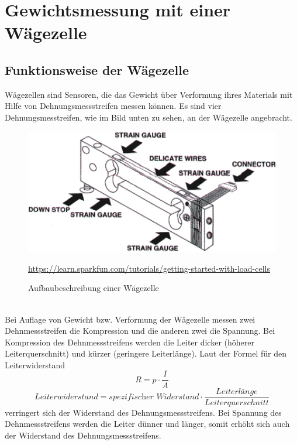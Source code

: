 \chapter{Gewichtsmessung mit einer Wägezelle}
\section{Funktionsweise der Wägezelle}
Wägezellen sind Sensoren, die das Gewicht über Verformung ihres Materials mit Hilfe von Dehnungsmessstreifen messen können. Es sind vier Dehnungsmesstreifen, wie im Bild unten zu sehen, an der Wägezelle angebracht.
\begin{figure}[ht]
    \center
    \includegraphics[width=15cm]{Bilder/waegezelle-aufbaubeschreibung.jpg}\\
    \caption{Aufbaubeschreibung einer Wägezelle}
    \begin{flushleft} \quelle\url{https://learn.sparkfun.com/tutorials/getting-started-with-load-cells} \end{flushleft}
\end{figure}\\
Bei Auflage von Gewicht bzw. Verformung der Wägezelle messen zwei Dehnmessstreifen die Kompression und die anderen zwei die Spannung. Bei Kompression des Dehnmessstreifens werden die Leiter dicker (höherer Leiterquerschnitt) und kürzer (geringere Leiterlänge). Laut der Formel für den Leiterwiderstand \[R=p \cdot \frac{I}{A}\] \[Leiterwiderstand=\textit{spezifischer Widerstand} \cdot \frac{\textit{Leiterlänge}}{Leiterquerschnitt}\] verringert sich der Widerstand des Dehnungsmessstreifens. Bei Spannung des Dehnmessstreifens werden die Leiter dünner und länger, somit erhöht sich auch der Widerstand des Dehnungsmessstreifens. 
\newpage
